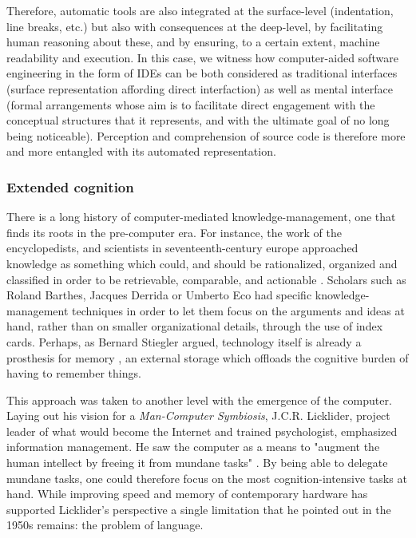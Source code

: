 Therefore, automatic tools are also integrated at the surface-level (indentation, line breaks, etc.) but also with consequences at the deep-level, by facilitating human reasoning about these, and by ensuring, to a certain extent, machine readability and execution. In this case, we witness how computer-aided software engineering in the form of IDEs can be both considered as traditional interfaces (surface representation affording direct interfaction) as well as mental interface (formal arrangements whose aim is to facilitate direct engagement with the conceptual structures that it represents, and with the ultimate goal of no long being noticeable). Perception and comprehension of source code is therefore more and more entangled with its automated representation.

\subsubsection{Extended cognition}

There is a long history of computer-mediated knowledge-management, one that finds its roots in the pre-computer era. For instance, the work of the encyclopedists, and scientists in seventeenth-century europe approached knowledge as something which could, and should be rationalized, organized and classified in order to be retrievable, comparable, and actionable \citep{sack_software_2019}. Scholars such as Roland Barthes, Jacques Derrida or Umberto Eco had specific knowledge-management techniques in order to let them focus on the arguments and ideas at hand, rather than on smaller organizational details, through the use of index cards. Perhaps, as Bernard Stiegler argued, technology itself is already a prosthesis for memory \citep{wilken_card_2010}, an external storage which offloads the cognitive burden of having to remember things.

This approach was taken to another level with the emergence of the computer. Laying out his vision for a \emph{Man-Computer Symbiosis}, J.C.R. Licklider, project leader of what would become the Internet and trained psychologist, emphasized information management. He saw the computer as a means to "augment the human intellect by freeing it from mundane tasks" \citep{licklider_mancomputer_1960}. By being able to delegate mundane tasks, one could therefore focus on the most cognition-intensive tasks at hand. While improving speed and memory of contemporary hardware has supported Licklider's perspective a single limitation that he pointed out in the 1950s remains: the problem of language.

